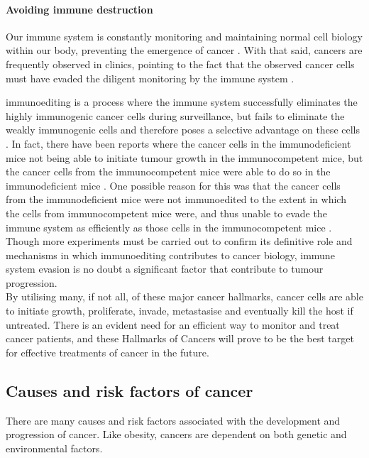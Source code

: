 \paragraph{Avoiding immune destruction}

\noindent
Our immune system is constantly monitoring and maintaining normal cell biology within our body, preventing the emergence of cancer \citep{Hanahan2011}.
With that said, cancers are frequently observed in clinics, pointing to the fact that the observed cancer cells must have evaded the diligent monitoring by the immune system \citep{Hanahan2011}.

\Gls{immunoediting} is a process where the immune system successfully eliminates the highly immunogenic cancer cells during surveillance, but fails to eliminate the weakly immunogenic cells and therefore poses a selective advantage on these cells \citep{Hanahan2011,Teng2008}.
In fact, there have been reports where the cancer cells in the immunodeficient mice not being able to initiate tumour growth in the immunocompetent mice, but the cancer cells from the immunocompetent mice were able to do so in the immunodeficient mice \citep{Hanahan2011}.
One possible reason for this was that the cancer cells from the immunodeficient mice were not immunoedited to the extent in which the cells from immunocompetent mice were, and thus unable to evade the immune system as efficiently as those cells in the immunocompetent mice \citep{Hanahan2011}.
Though more experiments must be carried out to confirm its definitive role and mechanisms in which immunoediting contributes to cancer biology, immune system evasion is no doubt a significant factor that contribute to tumour progression. \\

\noindent
By utilising many, if not all, of these major cancer hallmarks, cancer cells are able to initiate growth, proliferate, invade, metastasise and eventually kill the host if untreated.
There is an evident need for an efficient way to monitor and treat cancer patients, and these Hallmarks of Cancers will prove to be the best target for effective treatments of cancer in the future.

\subsection{Causes and risk factors of cancer}
\label{sub:causes_and_risk_factors_of_cancer}

There are many causes and risk factors associated with the development and progression of cancer.
Like obesity, cancers are dependent on both genetic and environmental factors.

